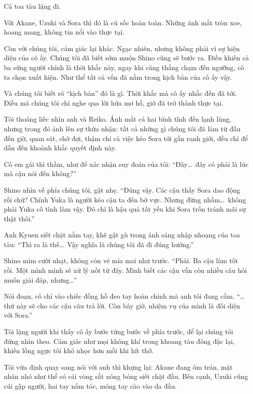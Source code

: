 \documentclass[../main.tex]{subfiles}
\begin{document}

Cả toa tàu lặng đi.

Với Akane, Uzuki và Sora thì đó là cú sốc hoàn toàn. Những ánh mắt tròn xoe, hoang mang, không tin nổi vào thực tại.

Còn với chúng tôi, cảm giác lại khác. Ngạc nhiên, nhưng không phải vì sự hiện diện của cô ấy. Chúng tôi đã biết sớm muộn Shino cũng sẽ bước ra. Điều khiến cả ba sững người chính là thời khắc này, ngay khi căng thẳng chạm đến ngưỡng, cô ta chọn xuất hiện. Như thể tất cả vốn đã nằm trong kịch bản của cô ấy vậy.

Và chúng tôi biết rõ ``kịch bản'' đó là gì. Thời khắc mà cô ấy nhắc đến đã tới. Điều mà chúng tôi chỉ nghe qua lời hứa mơ hồ, giờ đã trở thành thực tại.

Tôi thoáng liếc nhìn anh và Reiko. Ánh mắt cả hai bình tĩnh đến lạnh lùng, nhưng trong đó ánh lên sự thừa nhận: tất cả những gì chúng tôi đã làm từ đầu đến giờ, quan sát, chờ đợi, thậm chí cả việc kéo Sora tới gần ranh giới, đều chỉ để dẫn đến khoảnh khắc quyết định này.

Cô em gái thì thầm, như để xác nhận suy đoán của tôi: ``Đây\dots\ đây có phải là lúc mà cậu nói đến không?''

Shino nhìn về phía chúng tôi, gật nhẹ. ``Đúng vậy. Các cậu thấy Sora dao động rồi chứ? Chính Yuka là người kéo cậu ta đến bờ vực. Nhưng đừng nhầm\dots\ không phải Yuka cố tình làm vậy. Đó chỉ là hậu quả tất yếu khi Sora trốn tránh mãi sự thật thôi.''

Anh Kyuen siết chặt nắm tay, khẽ gật gù trong ánh sáng nhập nhoạng của toa tàu: ``Thì ra là thế\dots\ Vậy nghĩa là chúng tôi đã đi đúng hướng.''

Shino mỉm cười nhạt, không còn vẻ mỉa mai như trước. ``Phải. Ba cậu làm tốt rồi. Một mình mình sẽ xử lý nốt từ đây. Mình biết các cậu vẫn còn nhiều câu hỏi muốn giải đáp, nhưng\dots''

Nói đoạn, cô chỉ vào chiếc đồng hồ đeo tay hoàn chỉnh mà anh tôi đang cầm. ``\dots thứ này sẽ cho các cậu câu trả lời. Còn bây giờ, nhiệm vụ của mình là đối diện với Sora.''

Tôi lặng người khi thấy cô ấy bước từng bước về phía trước, để lại chúng tôi đứng nhìn theo. Cảm giác như mọi không khí trong khoang tàu đông đặc lại, khiến lồng ngực tôi khó nhọc hơn mỗi khi hít thở.

Tôi vừa định quay sang nói với anh thì khựng lại: Akane đang ôm trán, mặt nhăn nhó như thể có cái vòng sắt nóng bỏng siết chặt đầu. Bên cạnh, Uzuki cũng cúi gập người, hai tay nắm tóc, móng tay cào vào da đầu.
\end{document}

